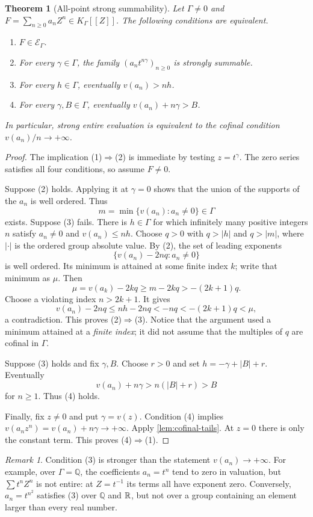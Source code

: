 \documentclass[11pt]{article}
\newtheorem{theorem}{Theorem}[section]
\theoremstyle{plain}
\theoremstyle{plain}
\theoremstyle{plain}
\theoremstyle{definition}
\theoremstyle{definition}
\theoremstyle{definition}
\theoremstyle{remark}
\newtheorem{remark}[remark]{Remark}
\newcommand{\Q}{\mathbb Q}\newcommand{\Z}{\mathbb Z}\newcommand{\N}{\mathbb N}
\newcommand{\K}{K_\Gamma}\newcommand{\E}{\mathcal E_\Gamma}
\begin{document}
\begin{theorem}[All-point strong summability]\label{thm:criterion}
Let $\Gamma\ne0$ and $F=\sum_{n\ge0}a_nZ^n\in\K[[Z]]$. The following
conditions are equivalent.
\begin{enumerate}[label=\textnormal{(\arabic*)},leftmargin=2em]
\item $F\in\E$.
\item For every $\gamma\in\Gamma$, the family
$(a_nt^{n\gamma})_{n\ge0}$ is strongly summable.
\item For every $h\in\Gamma$, eventually $v(a_n)>nh$.
\item For every $\gamma,B\in\Gamma$, eventually
$v(a_n)+n\gamma>B$.
\end{enumerate}
In particular, strong entire evaluation is equivalent to the cofinal
condition $v(a_n)/n\to+\infty$.
\end{theorem}
\begin{proof}
The implication (1)$\Rightarrow$(2) is immediate by testing $z=t^\gamma$.
The zero series satisfies all four conditions, so assume $F\ne0$.

Suppose (2) holds. Applying it at $\gamma=0$ shows that the union of
the supports of the $a_n$ is well ordered. Thus
\[
 m=\min\{v(a_n):a_n\ne0\}\in\Gamma
\]
exists. Suppose (3) fails. There is $h\in\Gamma$ for which infinitely
many positive integers $n$ satisfy $a_n\ne0$ and $v(a_n)\le nh$.
Choose $q>0$ with $q>|h|$ and $q>|m|$, where $|\cdot|$ is the ordered
group absolute value. By (2), the set of leading exponents
\[
 \{v(a_n)-2nq:a_n\ne0\}
\]
is well ordered. Its minimum is attained at some finite index $k$;
write that minimum as $\mu$. Then
\[
 \mu=v(a_k)-2kq\ge m-2kq>-(2k+1)q.
\]
Choose a violating index $n>2k+1$. It gives
\[
 v(a_n)-2nq\le nh-2nq<-nq<-(2k+1)q<\mu,
\]
a contradiction. This proves (2)$\Rightarrow$(3). Notice that the
argument used a minimum attained at a \emph{finite index}; it did not
assume that the multiples of $q$ are cofinal in $\Gamma$.

Suppose (3) holds and fix $\gamma,B$. Choose $r>0$ and set
$h=-\gamma+|B|+r$. Eventually
\[
 v(a_n)+n\gamma>n(|B|+r)>B
\]
for $n\ge1$. Thus (4) holds.

Finally, fix $z\ne0$ and put $\gamma=v(z)$. Condition (4) implies
$v(a_nz^n)=v(a_n)+n\gamma\to+\infty$. Apply
\cref{lem:cofinal-tails}. At $z=0$ there is only the constant term.
This proves (4)$\Rightarrow$(1).
\end{proof}

\begin{remark}
Condition (3) is stronger than the statement $v(a_n)\to+\infty$.
For example, over $\Gamma=\Q$, the coefficients $a_n=t^n$ tend to zero
in valuation, but $\sum t^nZ^n$ is not entire: at $Z=t^{-1}$ its
terms all have exponent zero. Conversely, $a_n=t^{n^2}$ satisfies (3)
over $\Q$ and $\mathbb R$, but not over a group containing an element larger
than every real number.
\end{remark}
\end{document}
